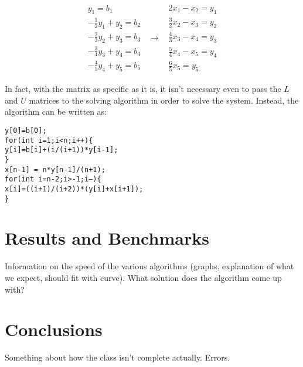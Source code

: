 \documentclass[12pt]{article}
\numberwithin{equation}{section}
\begin{document}
\begin{equation}
\begin{array}{ccc}
\begin{array}{c}
y_{1}=b_{1} \\
-\frac{1}{2}y_{1}+y_{2}=b_{2} \\
-\frac{2}{3}y_{2}+y_{3}=b_{3} \\
-\frac{3}{4}y_{3}+y_{4}=b_{4} \\
-\frac{4}{5}y_{4}+y_{5}=b_{5}
\end{array} & \rightarrow &
\begin{array}{c}
2x_{1}-x_{2}=y_{1} \\
\frac{3}{2}x_{2}-x_{3}=y_{2} \\
\frac{4}{3}x_{3}-x_{4}=y_{3} \\
\frac{5}{4}x_{4}-x_{5}=y_{4} \\
\frac{6}{5}x_{5}=y_{5}
\end{array}
\end{array}
\end{equation}

\noindent In fact, with the matrix as specific as it is, it isn't necessary even to pass the $L$ and $U$ matrices to the solving algorithm in order to solve the system.  Instead, the algorithm can be written as:

\begin{1stlisting}
\noindent \texttt{y[0]=b[0]; \\ for(int i=1;i<n;i++)\{ \\ \indent y[i]=b[i]+(i/(i+1))*y[i-1]; \\ \} \\ x[n-1] = n*y[n-1]/(n+1); \\ 
for(int i=n-2;i>-1;i--)\{ \\ \indent x[i]=((i+1)/(i+2))*(y[i]+x[i+1]); \\ \}}
\end{1stlisting}


\section{Results and Benchmarks}
\label{sec:results}

Information on the speed of the various algorithms (graphs, explanation of what we expect, should fit with curve).  What solution does the algorithm come up with?  

\section{Conclusions}
\label{sec:conclusions}

Something about how the class isn't complete actually.  Errors.
\end{document}

